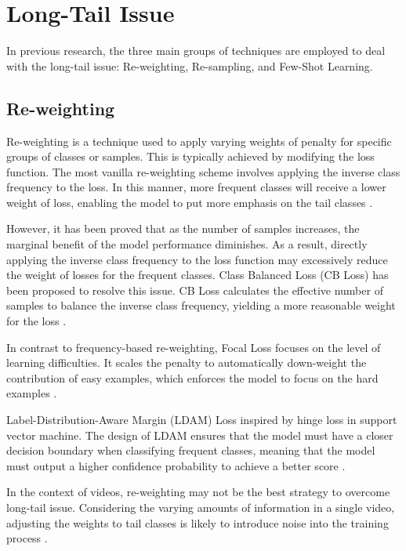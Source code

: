 
\section{Long-Tail Issue}
In previous research, the three main groups of techniques are employed to deal with the long-tail issue: Re-weighting, Re-sampling, and Few-Shot Learning.

\subsection{Re-weighting}
Re-weighting is a technique used to apply varying weights of penalty for specific groups of classes or samples. This is typically achieved by modifying the loss function. The most vanilla re-weighting scheme involves applying the inverse class frequency to the loss. In this manner, more frequent classes will receive a lower weight of loss, enabling the model to put more emphasis on the tail classes \parencite{khan2017cost, mostajabi2015feedforward}.

However, it has been proved that as the number of samples increases, the marginal benefit of the model performance diminishes. As a result, directly applying the inverse class frequency to the loss function may excessively reduce the weight of losses for the frequent classes. Class Balanced Loss (CB Loss) has been proposed to resolve this issue. CB Loss calculates the effective number of samples to balance the inverse class frequency, yielding a more reasonable weight for the loss \parencite{cui2019class}.

In contrast to frequency-based re-weighting, Focal Loss focuses on the level of learning difficulties. It scales the penalty to automatically down-weight the contribution of easy examples, which enforces the model to focus on the hard examples \parencite{lin2017focal}.

Label-Distribution-Aware Margin (LDAM) Loss inspired by hinge loss in support vector machine. The design of LDAM ensures that the model must have a closer decision boundary when classifying frequent classes, meaning that the model must output a higher confidence probability to achieve a better score \parencite{cao2019learning}.

In the context of videos, re-weighting may not be the best strategy to overcome long-tail issue. Considering the varying amounts of information in a single video, adjusting the weights to tail classes is likely to introduce noise into the training process \parencite{zhang2021videolt}. 

